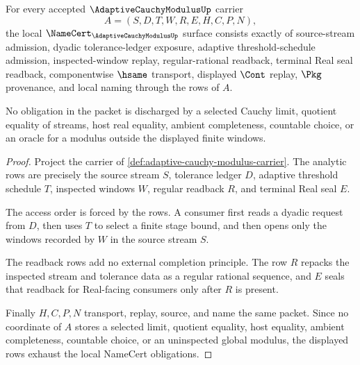 \begin{theorem}
\label{thm:adaptive-cauchy-modulus-namecert-obligations}
For every accepted $\AdaptiveCauchyModulusUp$ carrier
$$
A=(S,D,T,W,R,E,H,C,P,N),
$$
the local $\NameCert_{\AdaptiveCauchyModulusUp}$ surface consists exactly of source-stream admission, dyadic tolerance-ledger exposure, adaptive threshold-schedule admission, inspected-window replay, regular-rational readback, terminal Real seal readback, componentwise $\hsame$ transport, displayed $\Cont$ replay, $\Pkg$ provenance, and local naming through the rows of $A$.

No obligation in the packet is discharged by a selected Cauchy limit, quotient equality of streams, host real equality, ambient completeness, countable choice, or an oracle for a modulus outside the displayed finite windows.
\end{theorem}
\begin{proof}
Project the carrier of \autoref{def:adaptive-cauchy-modulus-carrier}. The analytic rows are precisely the source stream $S$, tolerance ledger $D$, adaptive threshold schedule $T$, inspected windows $W$, regular readback $R$, and terminal Real seal $E$.

The access order is forced by the rows. A consumer first reads a dyadic request from $D$, then uses $T$ to select a finite stage bound, and then opens only the windows recorded by $W$ in the source stream $S$.

The readback rows add no external completion principle. The row $R$ repacks the inspected stream and tolerance data as a regular rational sequence, and $E$ seals that readback for Real-facing consumers only after $R$ is present.

Finally $H,C,P,N$ transport, replay, source, and name the same packet. Since no coordinate of $A$ stores a selected limit, quotient equality, host equality, ambient completeness, countable choice, or an uninspected global modulus, the displayed rows exhaust the local NameCert obligations.
\end{proof}

